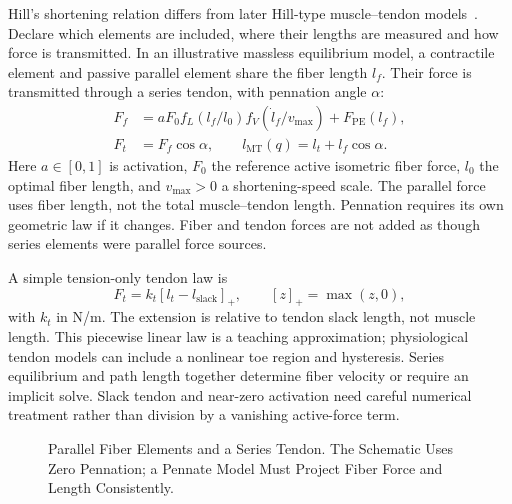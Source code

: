 Hill's shortening relation differs from later Hill-type muscle--tendon
models~\cite{Hill1938,millard2013flexing}. Declare which elements
are included, where their lengths are measured and how force is transmitted.
In an illustrative massless equilibrium model, a contractile element and passive
parallel element share the fiber length $l_f$. Their force is transmitted through
a series tendon, with pennation angle $\alpha$:
\begin{align}
F_f &= a F_0 f_L(l_f/l_0) f_V(\dot l_f/v_{\max})+F_{\mathrm{PE}}(l_f),
\label{eq:ch8:force-production}\\
F_t &= F_f\cos\alpha, \qquad
l_{\mathrm{MT}}(q)=l_t+l_f\cos\alpha.
\label{eq:ch8:hill-model}
\end{align}
Here $a\in[0,1]$ is activation, $F_0$ the reference active isometric fiber force,
$l_0$ the optimal fiber length, and $v_{\max}>0$ a shortening-speed scale.
The parallel force uses fiber length, not the total muscle--tendon length.
Pennation requires its own geometric law if it changes. Fiber and tendon forces
are not added as though series elements were parallel force sources.

A simple tension-only tendon law is
\begin{equation}
F_t=k_t[l_t-l_{\mathrm{slack}}]_+,
\qquad [z]_+=\max(z,0),
\label{eq:ch8:tendon-law}
\end{equation}
with $k_t$ in N/m. The extension is relative to tendon slack length, not muscle
length. This piecewise linear law is a teaching approximation; physiological
tendon models can include a nonlinear toe region and hysteresis. Series
equilibrium and path length together determine fiber velocity or require an
implicit solve. Slack tendon and near-zero activation need careful numerical
treatment rather than division by a vanishing active-force term.

\begin{figure}[htbp]
\centering
{}
\caption{Parallel Fiber Elements and a Series Tendon. The Schematic Uses Zero
Pennation; a Pennate Model Must Project Fiber Force and Length Consistently.}
\label{fig:ch8:hill-model}
\end{figure}

